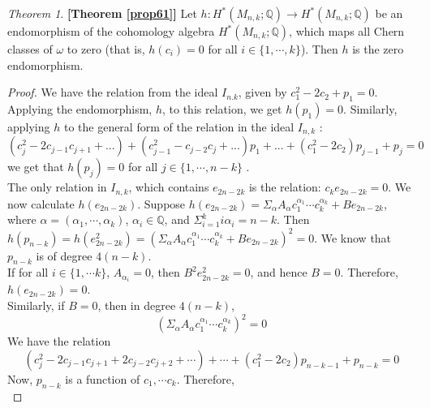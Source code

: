 \documentclass[a4paper,leqno,12pt]{amsart}
\theoremstyle{plain}
\theoremstyle{definition}
\theoremstyle{remark}
\newcommand{\Q}{\mathbb{Q}}
\begin{document}
{\newtheorem*{myprop}{Theorem}
\begin{myprop} {\bf [Theorem \ref{prop61}]} %
Let $h \colon H^{*} (M_{n,k} ; \Q) \rightarrow H^{*} (M_{n,k} ; \Q)$ be an endomorphism of the cohomology algebra   $H^{*} (M_{n,k} ; \Q)$,  which maps all Chern classes of $\omega$ to zero (that is,  $h(c_{i}) = 0$ for all $i \in \{1,  \cdots ,  k \}$).  Then $h$ is the zero endomorphism.  
\end{myprop}

\begin{proof}
We have the relation from the ideal $I_{n.k}$,  given by $c_{1}^{2} -2c_{2}+p_{1} =0$.  Applying the endomorphism,  $h$,  to this relation,  we get $h(p_{1}) = 0$.  Similarly,  applying $h$ to the general form of the relation in the ideal $I_{n,k}$ : 
\begin{equation}
      (c_{j}^{2}-2c_{j-1}c_{j+1}+...)+(c_{j-1}^{2}-c_{j-2}c_{j}+...)p_{1}+...+(c_{1}^{2}-2c_{2})p_{j-1}+p_{j}=0 \label{eqn67}
  \end{equation}
we get that $h(p_{j}) = 0$  for all $j \in \{1,  \cdots ,  n-k\}$ .  \\
The only relation in $I_{n,k}$,  which contains $e_{2n-2k}$ is the relation:  $c_{k} e_{2n-2k} = 0$.  We now calculate $h(e_{2n-2k} )$.  
Suppose $h(e_{2n-2k}) = \Sigma_{\alpha} A_{\alpha} c_{1}^{\alpha_{1}} \cdots c_{k}^{\alpha_{k}} + Be_{2n-2k}$,  where $\alpha = (\alpha_{1} ,  \cdots , \alpha_{k})$,  $\alpha_{i} \in \Q$,  and $\Sigma_{i=1}^{k} i \alpha_{i} = n-k$.   
Then  $h(p_{n-k}) = h(e_{2n-2k}^{2}) = (\Sigma_{\alpha} A_{\alpha} c_{1}^{\alpha_{1}} \cdots c_{k}^{\alpha_{k}} + B e_{2n-2k})^{2} = 0$.  
We know that $p_{n-k}$ is of degree $4(n-k)$.  \\
\noindent
If for all $i \in \{1,  \cdots k \}$,  $A_{\alpha_{i}} = 0$,  then $B^{2} e_{2n-2k}^{2} =0$,  and hence $B = 0$.  Therefore,  $h(e_{2n-2k}) = 0$.  \\
\noindent
Similarly,   if $B =0$,  then in degree $4(n-k)$,   
\begin{equation}
(\Sigma_{\alpha} A_{\alpha} c_{1}^{\alpha_{1}} \cdots c_{k}^{\alpha_{k}} )^{2} = 0
\label{eqn68}
\end{equation}
\noindent
We have the relation 
\begin{equation}
\label{eqn681}
 (c_{j}^{2} - 2c_{j-1}c_{j+1} + 2c_{j-2}c_{j+2}+ \cdots ) + \cdots + (c_{1}^{2} -2c_{2}) p_{n-k-1} + p_{n-k} =0
 \end{equation}
Now,  $p_{n-k}$ is a function of $c_{1},  \cdots c_{k}$.  Therefore,  
\begin{equation}

\end{equation}
\end{proof}}
\end{document}
